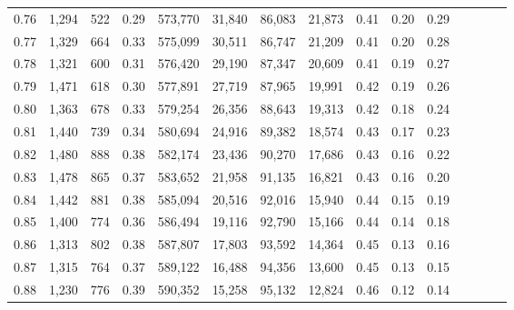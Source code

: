 \begin{tabular}{rrrcrrrrrrrrrrr}
0.76 &   1,294 &    522 &                                       0.29 &  573,770 &   31,840 &   86,083 &   21,873 &  0.41 &  0.20 &                         0.29 \\
0.77 &   1,329 &    664 &                                       0.33 &  575,099 &   30,511 &   86,747 &   21,209 &  0.41 &  0.20 &                         0.28 \\
0.78 &   1,321 &    600 &                                       0.31 &  576,420 &   29,190 &   87,347 &   20,609 &  0.41 &  0.19 &                         0.27 \\
0.79 &   1,471 &    618 &                                       0.30 &  577,891 &   27,719 &   87,965 &   19,991 &  0.42 &  0.19 &                         0.26 \\
0.80 &   1,363 &    678 &                                       0.33 &  579,254 &   26,356 &   88,643 &   19,313 &  0.42 &  0.18 &                         0.24 \\
0.81 &   1,440 &    739 &                                       0.34 &  580,694 &   24,916 &   89,382 &   18,574 &  0.43 &  0.17 &                         0.23 \\
0.82 &   1,480 &    888 &                                       0.38 &  582,174 &   23,436 &   90,270 &   17,686 &  0.43 &  0.16 &                         0.22 \\
0.83 &   1,478 &    865 &                                       0.37 &  583,652 &   21,958 &   91,135 &   16,821 &  0.43 &  0.16 &                         0.20 \\
0.84 &   1,442 &    881 &                                       0.38 &  585,094 &   20,516 &   92,016 &   15,940 &  0.44 &  0.15 &                         0.19 \\
0.85 &   1,400 &    774 &                                       0.36 &  586,494 &   19,116 &   92,790 &   15,166 &  0.44 &  0.14 &                         0.18 \\
0.86 &   1,313 &    802 &                                       0.38 &  587,807 &   17,803 &   93,592 &   14,364 &  0.45 &  0.13 &                         0.16 \\
0.87 &   1,315 &    764 &                                       0.37 &  589,122 &   16,488 &   94,356 &   13,600 &  0.45 &  0.13 &                         0.15 \\
0.88 &   1,230 &    776 &                                       0.39 &  590,352 &   15,258 &   95,132 &   12,824 &  0.46 &  0.12 &                         0.14 \\

\end{tabular}

